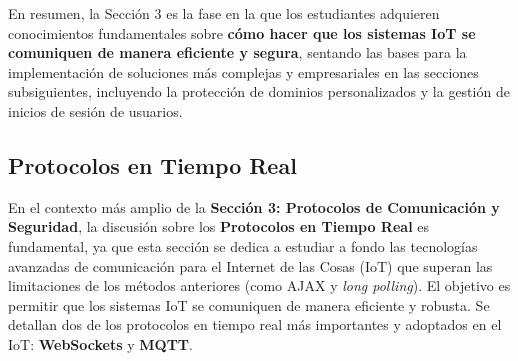 \documentclass{report}
\begin{document}
En resumen, la Sección 3 es la fase en la que los estudiantes adquieren conocimientos fundamentales sobre \textbf{cómo hacer que los sistemas IoT se 
comuniquen de manera eficiente y segura}, sentando las bases para la implementación de soluciones más complejas y empresariales en las secciones 
subsiguientes, incluyendo la protección de dominios personalizados y la gestión de inicios de sesión de usuarios.

\subsection{Protocolos en Tiempo Real}
En el contexto más amplio de la \textbf{Sección 3: Protocolos de Comunicación y Seguridad}, la discusión sobre los \textbf{Protocolos en Tiempo Real} 
es fundamental, ya que esta sección se dedica a estudiar a fondo las tecnologías avanzadas de comunicación para el Internet de las Cosas (IoT) que 
superan las limitaciones de los métodos anteriores (como AJAX y \textit{long polling}). El objetivo es permitir que los sistemas IoT se comuniquen 
de manera eficiente y robusta. Se detallan dos de los protocolos en tiempo real más importantes y adoptados en el IoT: \textbf{WebSockets} 
y \textbf{MQTT}.
\end{document}
